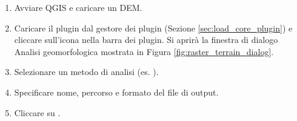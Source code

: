 \label{raster_terrain_usage}

\begin{enumerate}
  \item Avviare QGIS e caricare un DEM. 
  \item Caricare il plugin dal gestore dei plugin (Sezione \ref{sec:load_core_plugin}) 
  e cliccare sull'icona  nella barra dei plugin. 
 Si aprirà la finestra di dialogo Analisi geomorfologica mostrata in Figura \ref{fig:raster_terrain_dialog}.
  \item Selezionare un metodo di analisi (es. ).
  \item Specificare nome, percorso e formato del file di output.
  \item Cliccare su .
\end{enumerate}

\FloatBarrier
